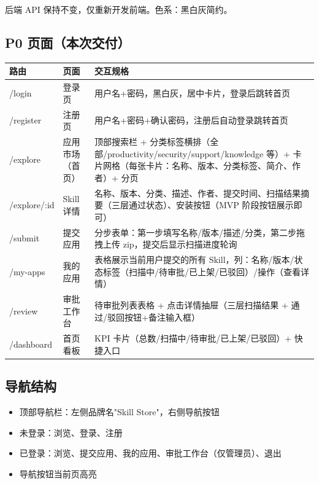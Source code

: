\documentclass[11pt,a4paper]{article}
\begin{document}
后端 API 保持不变，仅重新开发前端。色系：黑白灰简约。

\subsection{P0 页面（本次交付）}

\begin{table}[h]
\centering
\begin{tabularx}{\linewidth}{llp{6cm}}
\toprule
\textbf{路由} & \textbf{页面} & \textbf{交互规格} \\
\midrule
/login & 登录页 & 用户名+密码，黑白灰，居中卡片，登录后跳转首页 \\
/register & 注册页 & 用户名+密码+确认密码，注册后自动登录跳转首页 \\
/explore & 应用市场（首页） & 顶部搜索栏 + 分类标签横排（全部/productivity/security/support/knowledge 等）+ 卡片网格（每张卡片：名称、版本、分类标签、简介、作者）+ 分页 \\
/explore/:id & Skill 详情 & 名称、版本、分类、描述、作者、提交时间、扫描结果摘要（三层通过状态）、安装按钮（MVP 阶段按钮展示即可） \\
/submit & 提交应用 & 分步表单：第一步填写名称/版本/描述/分类，第二步拖拽上传 zip，提交后显示扫描进度轮询 \\
/my-apps & 我的应用 & 表格展示当前用户提交的所有 Skill，列：名称/版本/状态标签（扫描中/待审批/已上架/已驳回）/操作（查看详情） \\
/review & 审批工作台 & 待审批列表表格 + 点击详情抽屉（三层扫描结果 + 通过/驳回按钮+备注输入框） \\
/dashboard & 首页看板 & KPI 卡片（总数/扫描中/待审批/已上架/已驳回）+ 快捷入口 \\
\bottomrule
\end{tabularx}
\end{table}

\subsection{导航结构}

\begin{itemize}[nosep]
  \item 顶部导航栏：左侧品牌名"Skill Store"，右侧导航按钮
  \item 未登录：浏览、登录、注册
  \item 已登录：浏览、提交应用、我的应用、审批工作台（仅管理员）、退出
  \item 导航按钮当前页高亮
\end{itemize}
\end{document}
